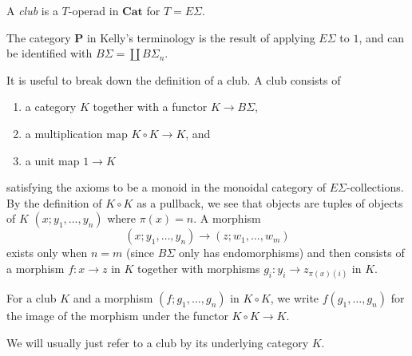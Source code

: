 \documentclass{amsbook} %
\newcommand{\mb}{\mathbf}
\numberwithin{section}{chapter}
\begin{document}
\begin{Defi}
A \textit{club} is a $T$-operad in $\mb{Cat}$ for $T = E\Sigma$.
\end{Defi}

\begin{rem}
The category $\mb{P}$ in Kelly's terminology is the result of applying $E\Sigma$ to $1$, and can be identified with $B\Sigma = \coprod B\Sigma_{n}$.
\end{rem}

It is useful to break down the definition of a club.  A club consists of
\begin{enumerate}
\item a category $K$ together with a functor $K \rightarrow B \Sigma$,
\item a multiplication map $K \circ K \rightarrow K$, and
\item a unit map $1 \rightarrow K$
\end{enumerate}
satisfying the axioms to be a monoid in the monoidal category of $E\Sigma$-collections.  By the definition of $K \circ K$ as a pullback, we see that objects are tuples of objects of $K$ $(x; y_{1}, \ldots, y_{n})$ where $\pi(x) = n$.  A morphism
  \[
    (x; y_{1}, \ldots, y_{n}) \rightarrow (z; w_{1}, \ldots, w_{m})
  \]
exists only when $n=m$ (since $B\Sigma$ only has endomorphisms) and then consists of a morphism $f \colon x \rightarrow z$ in $K$ together with morphisms $g_{i} \colon y_{i} \rightarrow z_{\pi(x)(i)}$ in $K$.

\begin{nota}\label{nota:clubmult}
For a club $K$ and a morphism $(f; g_{1}, \ldots, g_{n})$ in $K \circ K$, we write $f(g_{1}, \ldots, g_{n})$ for the image of the morphism under the functor $K \circ K \rightarrow K$.
\end{nota}

We will usually just refer to a club by its underlying category $K$.
\end{document}

